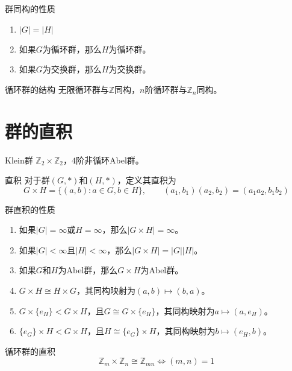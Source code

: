 \documentclass[lang = cn, scheme = chinese, thmcnt = section]{elegantbook}
\begin{document}
\begin{proposition}{群同构的性质}
	\begin{enumerate}
		\item $|G|=|H|$
		\item 如果$G$为循环群，那么$H$为循环群。
		\item 如果$G$为交换群，那么$H$为交换群。
	\end{enumerate}
\end{proposition}

\begin{theorem}{循环群的结构}
	无限循环群与$\mathbb{Z}$同构，$n$阶循环群与$\mathbb{Z}_n$同构。
\end{theorem}

\section{群的直积}

\begin{definition}{Klein群}
	$\mathbb{Z}_2\times \mathbb{Z}_2$，$4$阶非循环Abel群。
\end{definition}

\begin{definition}{直积}
	对于群$(G,*)$和$(H,*)$，定义其直积为
	$$
	G\times H=\{ (a,b):a\in G,b\in H \},\qquad (a_1,b_1)(a_2,b_2)=(a_1a_2,b_1b_2)
	$$
\end{definition}

\begin{proposition}{群直积的性质}
	\begin{enumerate}
		\item 如果$|G|=\infty$或$H=\infty$，那么$|G\times H|=\infty$。
		\item 如果$|G|<\infty$且$|H|<\infty$，那么$|G\times H|=|G||H|$。
		\item 如果$G$和$H$为Abel群，那么$G\times H$为Abel群。
		\item $G\times H\cong H\times G$，其同构映射为$(a,b)\mapsto(b,a)$。
		\item $G\times\{e_H\}<G\times H$，且$G\cong G\times\{e_H\}$，其同构映射为$a\mapsto(a,e_H)$。
		\item $\{e_G\}\times H<G\times H$，且$H\cong \{e_G\}\times H$，其同构映射为$b\mapsto(e_H,b)$。
	\end{enumerate}
\end{proposition}

\begin{theorem}{循环群的直积}
	$$
	\mathbb{Z}_m\times \mathbb{Z}_n\cong \mathbb{Z}_{mn}
	\iff (m,n)=1
	$$
\end{theorem}
\end{document}

